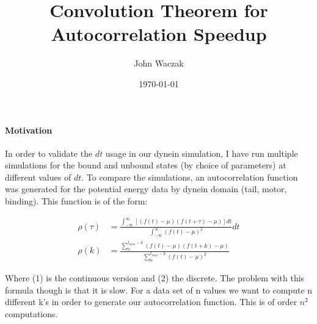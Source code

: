\documentclass[11pt]{article}
\begin{document}
	
\title{Convolution Theorem for Autocorrelation Speedup} 
\author{John Waczak} 
\date{\today}
\maketitle

\paragraph{Motivation} 	
	In order to validate the $dt$ usage in our dynein simulation, I have run multiple simulations for the bound and unbound states (by choice of parameters) at different values of $dt$. To compare the simulations, an autocorrelation function was generated for the potential energy data by dynein domain (tail, motor, binding). This function is of the form: 
	
	\begin{align}
		\rho(\tau) &= \frac{\int_{-\infty}^{\infty} [(f(t)-\mu)(f(t+\tau)-\mu)]dt}
		{\int_{-\infty}^{\infty}(f(t)-\mu)^2}dt \\ 
		\rho(k) &= \frac{\sum_{0}^{t_{max}-k} (f(t)-\mu)(f(t+k)-\mu)}
		{\sum_{0}^{t_{max}-k}(f(t)-\mu)^2}
	\end{align}
	
	Where (1) is the continuous version and (2) the discrete. The problem with this formula though is that it is slow. For a data set of n values we want to compute n different k's in order to generate our autocorrelation function. This is of order $n^2$ computations. 
\end{document}
